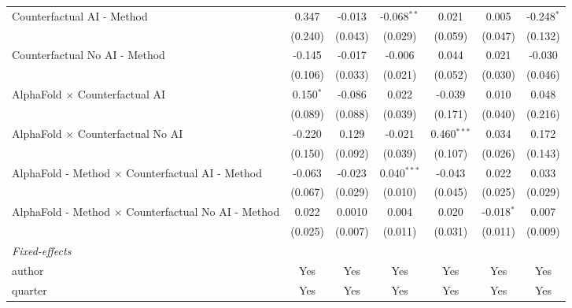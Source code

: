 \begin{tabular}{lcccccc}
   Counterfactual AI - Method                                 & 0.347       & -0.013  & -0.068$^{**}$ & 0.021         & 0.005         & -0.248$^{*}$\\   
                                                              & (0.240)     & (0.043) & (0.029)       & (0.059)       & (0.047)       & (0.132)\\   
   Counterfactual No AI - Method                              & -0.145      & -0.017  & -0.006        & 0.044         & 0.021         & -0.030\\   
                                                              & (0.106)     & (0.033) & (0.021)       & (0.052)       & (0.030)       & (0.046)\\   
   AlphaFold $\times$ Counterfactual AI                       & 0.150$^{*}$ & -0.086  & 0.022         & -0.039        & 0.010         & 0.048\\   
                                                              & (0.089)     & (0.088) & (0.039)       & (0.171)       & (0.040)       & (0.216)\\   
   AlphaFold $\times$ Counterfactual No AI                    & -0.220      & 0.129   & -0.021        & 0.460$^{***}$ & 0.034         & 0.172\\   
                                                              & (0.150)     & (0.092) & (0.039)       & (0.107)       & (0.026)       & (0.143)\\   
   AlphaFold - Method $\times$ Counterfactual AI - Method     & -0.063      & -0.023  & 0.040$^{***}$ & -0.043        & 0.022         & 0.033\\   
                                                              & (0.067)     & (0.029) & (0.010)       & (0.045)       & (0.025)       & (0.029)\\   
   AlphaFold - Method $\times$ Counterfactual No AI - Method  & 0.022       & 0.0010  & 0.004         & 0.020         & -0.018$^{*}$  & 0.007\\   
                                                              & (0.025)     & (0.007) & (0.011)       & (0.031)       & (0.011)       & (0.009)\\   
   \midrule
   \emph{Fixed-effects}\\
   author                                                     & Yes         & Yes     & Yes           & Yes           & Yes           & Yes\\  
   quarter                                                    & Yes         & Yes     & Yes           & Yes           & Yes           & Yes\\  

\end{tabular}
